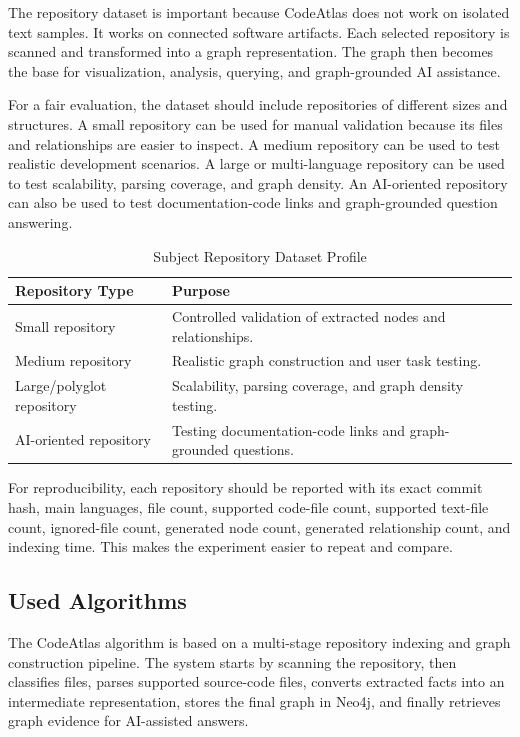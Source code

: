 \documentclass[conference]{IEEEtran}
\begin{document}
The repository dataset is important because CodeAtlas does not work on isolated text samples. It works on connected software artifacts. Each selected repository is scanned and transformed into a graph representation. The graph then becomes the base for visualization, analysis, querying, and graph-grounded AI assistance.

For a fair evaluation, the dataset should include repositories of different sizes and structures. A small repository can be used for manual validation because its files and relationships are easier to inspect. A medium repository can be used to test realistic development scenarios. A large or multi-language repository can be used to test scalability, parsing coverage, and graph density. An AI-oriented repository can also be used to test documentation-code links and graph-grounded question answering.

\begin{table}[!t]
\caption{Subject Repository Dataset Profile}
\label{tab:repos}
\centering
\begin{tabularx}{\columnwidth}{lY}
\toprule
\textbf{Repository Type} & \textbf{Purpose} \\
\midrule
Small repository & Controlled validation of extracted nodes and relationships. \\
Medium repository & Realistic graph construction and user task testing. \\
Large/polyglot repository & Scalability, parsing coverage, and graph density testing. \\
AI-oriented repository & Testing documentation-code links and graph-grounded questions. \\
\bottomrule
\end{tabularx}
\end{table}

For reproducibility, each repository should be reported with its exact commit hash, main languages, file count, supported code-file count, supported text-file count, ignored-file count, generated node count, generated relationship count, and indexing time. This makes the experiment easier to repeat and compare.

\subsection{Used Algorithms}
The CodeAtlas algorithm is based on a multi-stage repository indexing and graph construction pipeline. The system starts by scanning the repository, then classifies files, parses supported source-code files, converts extracted facts into an intermediate representation, stores the final graph in Neo4j, and finally retrieves graph evidence for AI-assisted answers.
\end{document}

